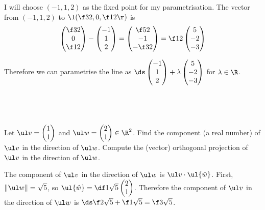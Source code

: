 \documentclass[a4paper]{article}
\begin{document}
I will choose $(-1, 1, 2)$ as the fixed point for my parametrisation. The vector from $(-1, 1, 2)$ to $\l( \f32, 0, \f12 \r)$ is $$\begin{pmatrix}\f32\\ 0\\ \f12\end{pmatrix} - \begin{pmatrix}-1\\ 1\\ 2\end{pmatrix} = \begin{pmatrix}\f52\\ -1\\ -\f32\end{pmatrix} = \f12 \begin{pmatrix}5\\ -2\\ -3\end{pmatrix}$$

Therefore we can parametrise the line as $\ds\begin{pmatrix}-1\\ 1\\ 2\end{pmatrix} + \lambda \begin{pmatrix}5\\ -2\\ -3\end{pmatrix}$ for $\lambda \in \R$.


\subsection{~} %

\begin{questionbody}
Let $\ul v = \begin{pmatrix}1\\ 1\end{pmatrix}$ and $\ul w = \begin{pmatrix}2\\ 1\end{pmatrix} \in \R^2$. Find the component (a real number) of $\ul v$ in the direction of $\ul w$. Compute the (vector) orthogonal projection of $\ul v$ in the direction of $\ul w$.
\end{questionbody}

The component of $\ul v$ in the direction of $\ul w$ is $\ul v \cdot \ul{\hat w}$. First, $\|\ul w\| = \sqrt5$, so $\ul{\hat w} = \df1{\sqrt5} \begin{pmatrix}2\\ 1\end{pmatrix}$. Therefore the component of $\ul v$ in the direction of $\ul w$ is $\ds \f2{\sqrt5} + \f1{\sqrt5} = \f3{\sqrt5}$.
\end{document}
